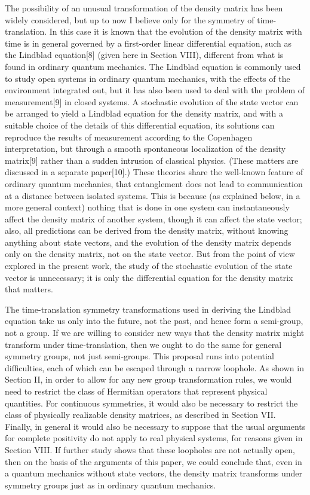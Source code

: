 The possibility of an unusual transformation of the density matrix has been widely considered, but up to now I believe only for the symmetry of time-translation.  In this case it is known that the evolution of the density matrix with time is in general governed by a first-order linear differential equation, such as the Lindblad equation[8] (given here in Section VIII), different from what is found in ordinary quantum mechanics.  The Lindblad equation is commonly used to study open systems in ordinary quantum mechanics, with the effects of the environment integrated out, but it has also been  used to deal with the problem of measurement[9] in closed systems.  A stochastic evolution of the state vector can be arranged to yield a Lindblad equation for the density matrix, and with a  suitable choice of the details of this differential equation, its solutions can reproduce the results of measurement according to the Copenhagen interpretation, but through a smooth spontaneous localization of the density matrix[9] rather than a sudden intrusion of classical physics.  (These matters are discussed in a separate paper[10].)  These theories share the well-known feature of ordinary quantum mechanics, that entanglement does not lead to communication at a distance between isolated systems.  This is because (as explained below, in a more general context) nothing that is done in one system can instantaneously affect the density matrix of another system, though it can affect the state vector; also, all predictions can be derived from the density matrix, without knowing anything about state vectors, and the evolution of the density matrix depends only on the density matrix, not on the state vector.  But from the point of view explored in the present work, the study of the stochastic evolution of the state vector is unnecessary; it is only the differential equation for the density matrix that matters.  



The time-translation symmetry transformations used in deriving the Lindblad equation take us only into the future, not the past, and hence form a semi-group, not a group.  If we are willing to consider new ways that the density matrix might transform under time-translation, then we ought to do the same for general symmetry groups, not just semi-groups.   This proposal runs into potential difficulties, each of which can be escaped through a narrow loophole.  As shown in Section II, in order to allow for any new group transformation rules, we would need to restrict the class of Hermitian operators that represent physical quantities.  For continuous symmetries, it would also be necessary to restrict the class of physically realizable density matrices, as described in Section VII.  Finally, in general it would also be necessary to suppose that the usual arguments for complete positivity do not apply to real physical systems, for reasons given in Section VIII.  If further study shows that these loopholes are not actually open, then on the basis of the arguments of this paper, we could conclude that, even in a quantum mechanics without state vectors, the density matrix transforms under symmetry groups just as in ordinary quantum mechanics.

